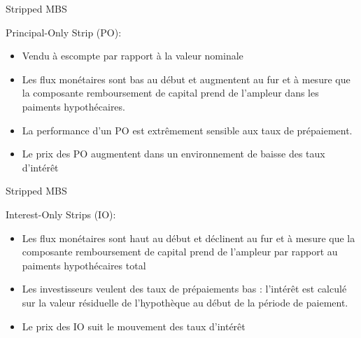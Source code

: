 \documentclass{beamer}
\begin{document}
\begin{frame}{Stripped MBS}
\begin{block}{Principal-Only Strip (PO):}
\begin{itemize}[label=\bullet]
\item Vendu à escompte par rapport à la valeur nominale
\vspace{0.3cm}
\item Les flux monétaires sont bas au début et augmentent au fur et à mesure que la composante remboursement de capital prend de l’ampleur dans les paiments hypothécaires.
\vspace{0.3cm}
\item La performance d’un PO est extrêmement sensible aux taux de prépaiement.
\vspace{0.3cm}
\item Le prix des PO augmentent dans un environnement de baisse des taux d’intérêt
\end{itemize}
\end{block}

\end{frame}


\begin{frame}{Stripped MBS}
\begin{block}{Interest-Only Strips (IO):}
\begin{itemize}[label=\bullet]
\item Les flux monétaires sont haut au début et déclinent au fur et à mesure que la composante remboursement de capital prend de l’ampleur par rapport au paiments hypothécaires total
\vspace{0.3cm}
\item Les investisseurs veulent des taux de prépaiements bas : l’intérêt est calculé sur la valeur résiduelle de l’hypothèque au début de la période de paiement.
\vspace{0.3cm}
\item Le prix des IO suit le mouvement des taux d’intérêt
\end{itemize}
\end{block}

\end{frame}
\end{document}
